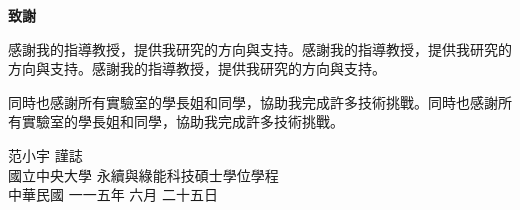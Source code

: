 \begin{center}
	\LARGE {\textbf{致謝}}
\end{center}

\bigskip  %
感謝我的指導教授，提供我研究的方向與支持。感謝我的指導教授，提供我研究的方向與支持。感謝我的指導教授，提供我研究的方向與支持。

\bigskip %
同時也感謝所有實驗室的學長姐和同學，協助我完成許多技術挑戰。同時也感謝所有實驗室的學長姐和同學，協助我完成許多技術挑戰。

\vspace{3em}

\begin{flushright}
范小宇 \qquad 謹誌 \\
國立中央大學 \quad 永續與綠能科技碩士學位學程\\
中華民國 \quad 一一五年 六月 二十五日
\end{flushright}
